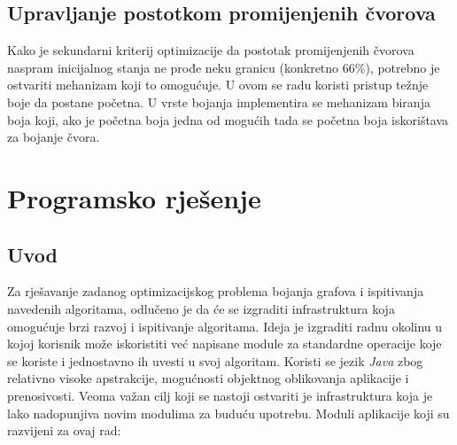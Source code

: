 \documentclass[times, utf8, diplomski, numeric]{fer}
\begin{document}
\section{Upravljanje postotkom promijenjenih čvorova}

Kako je sekundarni kriterij optimizacije da postotak promijenjenih čvorova naspram inicijalnog stanja ne prođe neku granicu (konkretno 66\%), potrebno je ostvariti mehanizam koji to omogućuje. U ovom se radu koristi pristup težnje boje da postane početna. U vrste bojanja implementira se mehanizam biranja boja koji, ako je početna boja jedna od mogućih tada se početna boja iskorištava za bojanje čvora.

\chapter{Programsko rješenje}

\section{Uvod}

Za rješavanje zadanog optimizacijskog problema bojanja grafova i ispitivanja navedenih algoritama, odlučeno je da će se izgraditi infrastruktura koja omogućuje brzi razvoj i ispitivanje algoritama. Ideja je izgraditi radnu okolinu u kojoj korisnik može iskoristiti već napisane module za standardne operacije koje se koriste i jednostavno ih uvesti u svoj algoritam. Koristi se jezik \emph{Java} zbog relativno visoke apstrakcije, mogućnosti objektnog oblikovanja aplikacije i prenosivosti. Veoma važan cilj koji se nastoji ostvariti je infrastruktura koja je lako nadopunjiva novim modulima za buduću upotrebu. Moduli aplikacije koji su razvijeni za ovaj rad:
\end{document}
